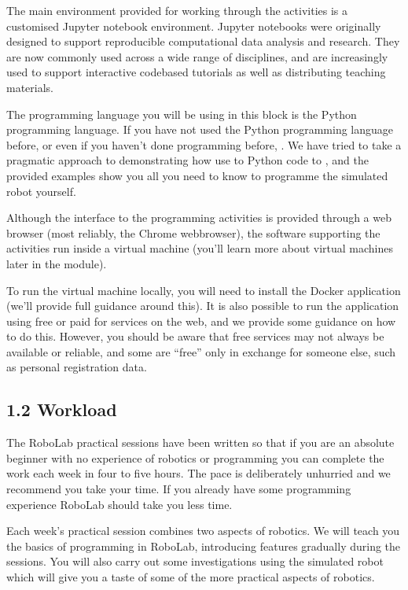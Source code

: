\documentclass[letterpaper,10pt,english]{sphinxmanual}
\begin{document}
The main environment provided for working through the activities is a customised Jupyter notebook environment. Jupyter notebooks were originally designed to support reproducible computational data analysis and research. They are now commonly used across a wide range of disciplines, and are increasingly used to support interactive code\sphinxhyphen{}based tutorials as well as distributing teaching materials.

The programming language you will be using in this block is the Python programming language. If you have not used the Python programming language before, or even if you haven’t done  programming before, . We have tried to take a pragmatic approach to demonstrating how use to Python code to , and the provided examples show you all you need to know to programme the simulated robot yourself.

Although the interface to the programming activities is provided through a web browser (most reliably, the Chrome web\sphinxhyphen{}browser), the software supporting the activities run inside a virtual machine (you’ll learn more about virtual machines later in the module).

To run the virtual machine locally, you will need to install the Docker application (we’ll provide full guidance around this). It is also possible to run the application using free or paid for services on the web, and we provide some guidance on how to do this. However, you should be aware that free services may not always be available or reliable, and some are “free” only in exchange for someone else, such as personal registration data.


\subsection{1.2 Workload}
\label{\detokenize{content/00_READ_ME_FIRST/Section_00_02_Workload:1.2-Workload}}\label{\detokenize{content/00_READ_ME_FIRST/Section_00_02_Workload::doc}}
The RoboLab practical sessions have been written so that if you are an absolute beginner with no experience of robotics or programming you can complete the work each week in four to five hours. The pace is deliberately unhurried and we recommend you take your time. If you already have some programming experience RoboLab should take you less time.

Each week’s practical session combines two aspects of robotics. We will teach you the basics of programming in RoboLab, introducing features gradually during the sessions. You will also carry out some investigations using the simulated robot which will give you a taste of some of the more practical aspects of robotics.
\end{document}
